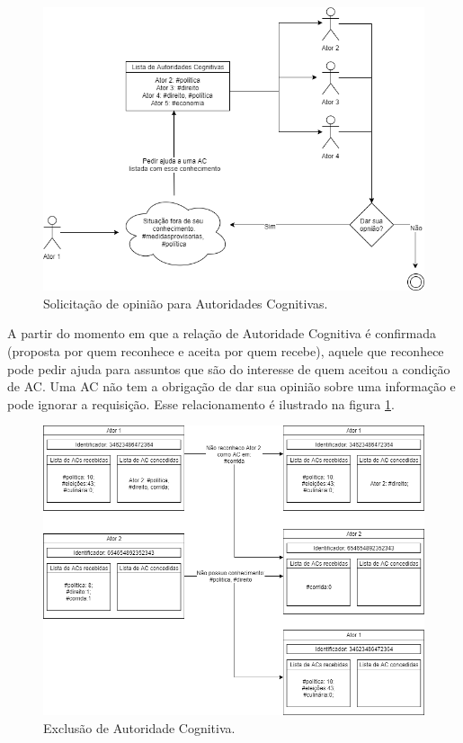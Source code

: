 \begin{figure}[ht]
\centering
\includegraphics[scale=0.65]{4-proposta/diagrama_ajuda.png}
\caption{Solicitação de opinião para Autoridades Cognitivas.}
\label{fig:diagrama_ajuda}
\end{figure}

A partir do momento em que a relação de Autoridade Cognitiva é confirmada (proposta por quem reconhece e aceita por quem recebe), aquele que reconhece pode pedir ajuda para assuntos que são do interesse de quem aceitou a condição de AC. Uma AC não tem a obrigação de dar sua opinião sobre uma informação e pode ignorar a requisição. Esse relacionamento é ilustrado na figura \ref{fig:diagrama_ajuda}.

\begin{figure}[ht]
\centering
\includegraphics[scale=0.55]{4-proposta/diagrama_exclusao.png}
\caption{Exclusão de Autoridade Cognitiva.}
\label{fig:diagrama_exclusao}
\end{figure}


